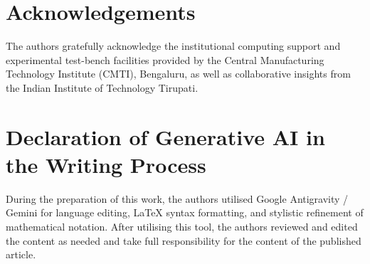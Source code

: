 \documentclass[a4paper,fleqn]{cas-dc}
\begin{document}
\section*{Acknowledgements}
The authors gratefully acknowledge the institutional computing support and experimental test-bench facilities provided by the Central Manufacturing Technology Institute (CMTI), Bengaluru, as well as collaborative insights from the Indian Institute of Technology Tirupati.

\section*{Declaration of Generative AI in the Writing Process}
During the preparation of this work, the authors utilised Google Antigravity / Gemini for language editing, \LaTeX{} syntax formatting, and stylistic refinement of mathematical notation. After utilising this tool, the authors reviewed and edited the content as needed and take full responsibility for the content of the published article.



\end{document}
